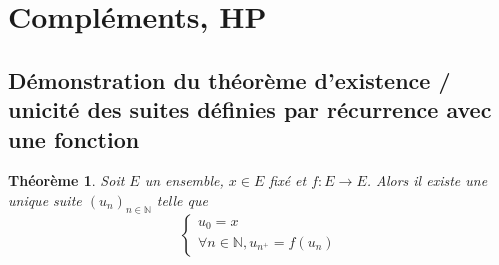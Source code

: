 \documentclass[french]{book}
\theoremstyle{plain}
\newtheorem{thm}{Théorème}[chapter]
\theoremstyle{definition}
\theoremstyle{remark}
\begin{document}
\section{Compléments, HP}
\subsection{Démonstration du théorème d'existence / unicité des suites définies par récurrence avec une fonction}

\begin{thm}
	Soit $E$ un ensemble, $x \in E$ fixé et $f : E \rightarrow E$. Alors il existe une unique suite $(u_n)_{n \in \mathbb{N}}$ telle que $$\begin{cases}
		u_0 = x \\
		\forall n \in \mathbb{N}, u_{n^+} = f(u_n)
	\end{cases}$$
\end{thm}
\end{document}
